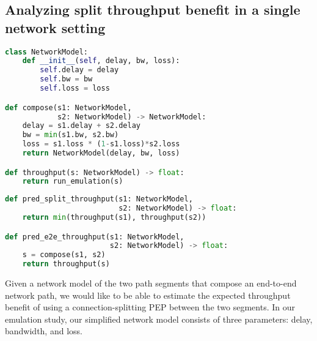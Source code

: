 \subsection{Analyzing split throughput benefit in a single network setting}
\label{sec:splitting:heuristic:example}

\begin{lstfloat}[t]
\begin{lstlisting}[language=Python]
class NetworkModel:
    def __init__(self, delay, bw, loss):
        self.delay = delay
        self.bw = bw
        self.loss = loss

def compose(s1: NetworkModel,
            s2: NetworkModel) -> NetworkModel:
    delay = s1.delay + s2.delay
    bw = min(s1.bw, s2.bw)
    loss = s1.loss * (1-s1.loss)*s2.loss
    return NetworkModel(delay, bw, loss)

def throughput(s: NetworkModel) -> float:
    return run_emulation(s)
\end{lstlisting}
\label{lst:multi-segment-network-model}
\end{lstfloat}

\begin{lstfloat}[t]
\begin{lstlisting}[language=Python]
def pred_split_throughput(s1: NetworkModel,
                          s2: NetworkModel) -> float:
    return min(throughput(s1), throughput(s2))

def pred_e2e_throughput(s1: NetworkModel,
                        s2: NetworkModel) -> float:
    s = compose(s1, s2)
    return throughput(s)
\end{lstlisting}
\label{lst:pred-throughput-api}
\end{lstfloat}

Given a network model of the two path segments that compose an end-to-end
network path, we would like to be able to estimate the expected throughput
benefit of using a connection-splitting PEP between the two segments. In our
emulation study, our simplified network model consists of three
parameters: delay, bandwidth, and loss.

